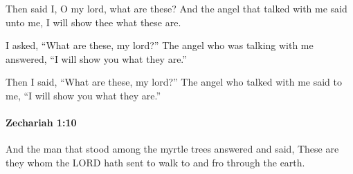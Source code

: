 			\begin{versebox}
					\item[BHS] 
					\item[LXX] 
					\item[ASV] Then said I, O my lord, what are these? And the angel that talked with me said unto me, I will show thee what these are.
					\item[NIV] I asked, “What are these, my lord?” The angel who was talking with me answered, “I will show you what they are.”
					\item[NRSV] Then I said, “What are these, my lord?” The angel who talked with me said to me, “I will show you what they are.”
			\end{versebox}

		\paragraph{Zechariah 1:10} %
			\label{ZECHARIAH-1-10}

			And the man that stood among the myrtle trees answered and said, These are they whom the LORD hath sent to walk to and fro through the earth.

